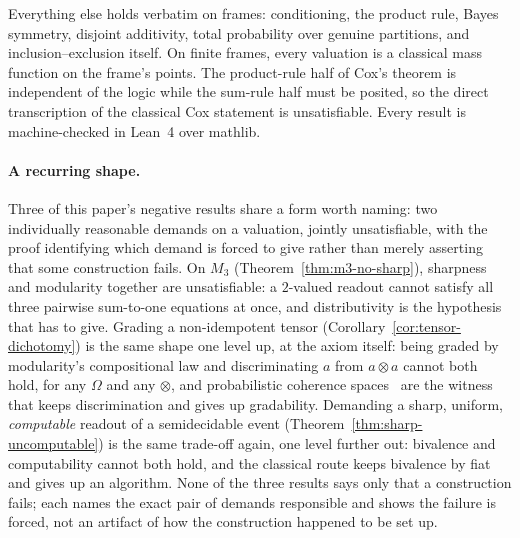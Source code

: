 Everything else holds
verbatim on frames: conditioning, the product rule, Bayes symmetry,
disjoint additivity, total probability over genuine partitions, and
inclusion--exclusion itself.  On
finite frames, every valuation is a classical mass function on the
frame's points.  The product-rule half of Cox's theorem is
independent of the logic while the sum-rule half must be posited, so 
the direct transcription of the classical Cox statement is
unsatisfiable. Every result is machine-checked in
Lean~4 over \textsf{mathlib}.

\paragraph{A recurring shape.}
Three of this paper's negative results share a form worth naming: two
individually reasonable demands on a valuation, jointly unsatisfiable,
with the proof identifying which demand is forced to give rather than
merely asserting that some construction fails. On $M_3$
(Theorem~\ref{thm:m3-no-sharp}), sharpness and modularity together are
unsatisfiable: a $2$-valued readout cannot satisfy all three pairwise
sum-to-one equations at once, and distributivity is the hypothesis that
has to give. Grading a non-idempotent tensor
(Corollary~\ref{cor:tensor-dichotomy}) is the same shape one level up,
at the axiom itself: being graded by modularity's compositional law
and discriminating $a$ from $a \otimes a$ cannot both hold, for any
$\Omega$ and any $\otimes$, and probabilistic coherence
spaces~\cite{danos-ehrhard2011} are the witness that keeps
discrimination and gives up gradability. Demanding a sharp, uniform,
\emph{computable} readout of a semidecidable event
(Theorem~\ref{thm:sharp-uncomputable}) is the same trade-off again, one
level further out: bivalence and computability cannot both hold, and
the classical route keeps bivalence by fiat and gives up an algorithm.
None of the three results says only that a construction fails; each
names the exact pair of demands responsible and shows the failure is
forced, not an artifact of how the construction happened to be set up.

